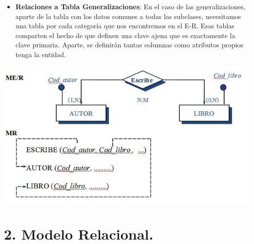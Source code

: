 \documentclass[a4paper, 12pt]{report}
\begin{document}
{\begin{enumerate}[label=(\alph*)]
\begin{itemize}
			Debe hacerse notar que, mientras en E-R es posible definir 			restricciones de existencia sobre esta relación, en MR 	
			necesariamente ha de considerarse una pérdida semántica si 			queremos que nuestra representación, este conjunto de 	
			tablas, se comporte realmente como una N:M. 
			\item \textbf{Relaciones a Tabla Generalizaciones}: En el 	
			caso de las generalizaciones, aparte de la tabla con los 	
			datos comunes a todas las subclases, necesitamos una tabla 			por cada categoría que nos encontremos en el E-R. Esas 	
			tablas comparten el hecho de que definen una clave ajena 	
			que es exactamente la clave primaria. Aparte, se definirán 			tantas columnas como atributos propios tenga la entidad.  
		 \end{itemize}
		 \begin{center}
		 \includegraphics[scale= 0.7]{img/Ejemplo.jpg}
		 \end{center}	 
	\end{enumerate}
}

\section*{2. Modelo Relacional.}{
}
\end{document}
